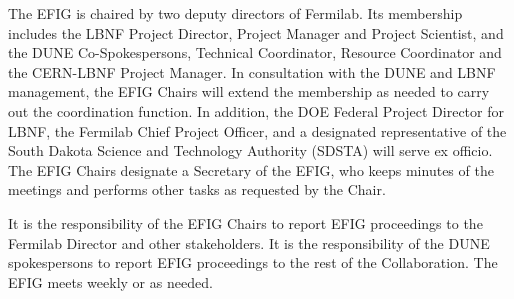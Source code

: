 The EFIG is chaired by two deputy directors of Fermilab.
Its membership includes the LBNF Project Director, Project Manager and Project Scientist, and 
the DUNE Co-Spokespersons, Technical Coordinator, Resource Coordinator and the CERN-LBNF Project Manager.
In consultation with the DUNE and LBNF management, the EFIG Chairs will
extend the membership as needed 
to carry out the coordination
function. In addition, the DOE Federal Project Director for LBNF,
the Fermilab Chief Project Officer, and a designated representative
of the South Dakota Science and Technology Authority (SDSTA) will
serve ex officio. The EFIG Chairs designate a Secretary of the EFIG,
who keeps minutes of the meetings and performs other tasks as
requested by the Chair.

It is the responsibility of the EFIG Chairs to report EFIG proceedings
to the Fermilab Director and other stakeholders. It is the responsibility
of the DUNE spokespersons to report EFIG proceedings to the rest of
the Collaboration. The EFIG meets weekly or as needed.


